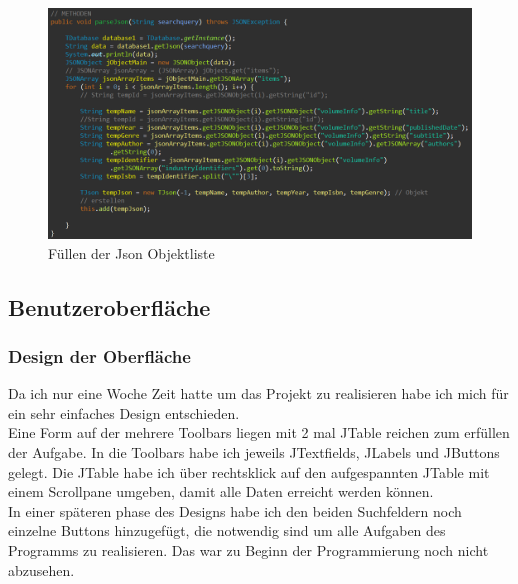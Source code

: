 \begin{figure}[h]
\begin{center}
\includegraphics[width=15cm]{img/parseJson.png}
\caption{Füllen der Json Objektliste}
\label{parsejson}
\end{center}
\end{figure}

\newpage
\subsection{Benutzeroberfläche}
\subsubsection{Design der Oberfläche}
Da ich nur eine Woche Zeit hatte um das Projekt zu realisieren habe ich mich für ein sehr einfaches Design entschieden.\\
Eine Form auf der mehrere Toolbars liegen mit 2 mal JTable reichen zum erfüllen der Aufgabe. In die Toolbars habe ich jeweils JTextfields, JLabels und JButtons gelegt.
Die JTable habe ich über rechtsklick auf den aufgespannten JTable mit einem Scrollpane umgeben, damit alle Daten erreicht werden können.\\
In einer späteren phase des Designs habe ich den beiden Suchfeldern noch einzelne Buttons hinzugefügt, die notwendig sind um alle Aufgaben des Programms zu realisieren. Das war zu Beginn der Programmierung noch nicht abzusehen.\\


